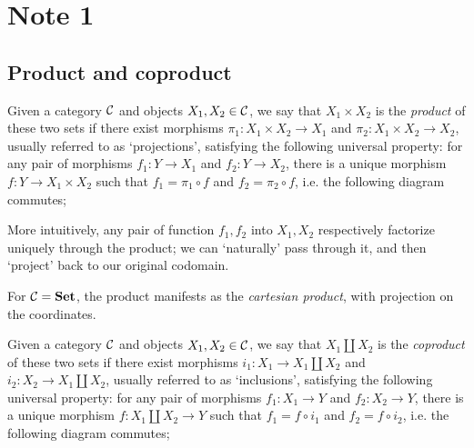 
\section{Note 1}

\subsection{Product and coproduct}

\begin{definition}[Product]
	Given a category $\mathcal{C}$ and objects $X_1,X_2\in\mathcal{C}$, we say that $X_1\times X_2$ is the \emph{product} of these two sets if there exist morphisms $\pi_1:X_1\times X_2 \to X_1$ and $\pi_2:X_1\times X_2\to X_2$, usually referred to as `projections', satisfying the following universal property: for any pair of morphisms $f_1:Y\to X_1$ and $f_2:Y\to X_2$, there is a unique morphism $f:Y\to X_1\times X_2$ such that $f_1=\pi_1 \circ f$ and $f_2=\pi_2 \circ f$, i.e. the following diagram commutes;

	\begin{figure}[!ht]
	\centering
	\end{figure}
\end{definition}

More intuitively, any pair of function $f_1,f_2$ into $X_1,X_2$ respectively factorize uniquely through the product; we can `naturally' pass through it, and then `project' back to our original codomain.

For $\mathcal{C}=\mathbf{Set}$, the product manifests as the \emph{cartesian product}, with projection on the coordinates.

\begin{definition}[Coproduct]
	Given a category $\mathcal{C}$ and objects $X_1,X_2\in\mathcal{C}$, we say that $X_1\coprod X_2$ is the \emph{coproduct} of these two sets if there exist morphisms $i_1:X_1\to X_1\coprod X_2$ and $i_2:X_2\to X_1\coprod X_2$, usually referred to as `inclusions', satisfying the following universal property: for any pair of morphisms $f_1:X_1\to Y$ and $f_2:X_2\to Y$, there is a unique morphism $f:X_1\coprod X_2\to Y$ such that $f_1=f\circ i_1$ and $f_2=f\circ i_2$, i.e. the following diagram commutes;

	\begin{figure}[!ht]
	\centering
	\end{figure}
\end{definition}

